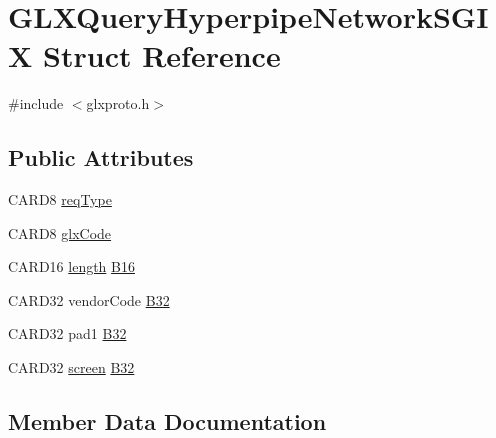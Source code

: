 \hypertarget{struct_g_l_x_query_hyperpipe_network_s_g_i_x}{}\section{G\+L\+X\+Query\+Hyperpipe\+Network\+S\+G\+IX Struct Reference}
\label{struct_g_l_x_query_hyperpipe_network_s_g_i_x}


{\ttfamily \#include $<$glxproto.\+h$>$}

\subsection*{Public Attributes}
\begin{DoxyCompactItemize}
\item 
C\+A\+R\+D8 \hyperlink{struct_g_l_x_query_hyperpipe_network_s_g_i_x_a19f7318eb42362aea35758a7ef076a65}{req\+Type}
\item 
C\+A\+R\+D8 \hyperlink{struct_g_l_x_query_hyperpipe_network_s_g_i_x_a4e79bfc34869610ed04694ca723fdf6e}{glx\+Code}
\item 
C\+A\+R\+D16 \hyperlink{glcorearb_8h_ab9c919755bde3b34349e23a32b4e0fa7}{length} \hyperlink{struct_g_l_x_query_hyperpipe_network_s_g_i_x_a7eaae9e86f0e5b48330c936e6e951ac2}{B16}
\item 
C\+A\+R\+D32 vendor\+Code \hyperlink{struct_g_l_x_query_hyperpipe_network_s_g_i_x_afac72e950f26a6c6340463502574396f}{B32}
\item 
C\+A\+R\+D32 pad1 \hyperlink{struct_g_l_x_query_hyperpipe_network_s_g_i_x_a282ea4c08dc7cfe69edec7dc02933666}{B32}
\item 
C\+A\+R\+D32 \hyperlink{cad_8h_ae04e09e4e3831bfc1632c509ae37dcec}{screen} \hyperlink{struct_g_l_x_query_hyperpipe_network_s_g_i_x_a71afe950eaab6e945b0e11646947e3b4}{B32}
\end{DoxyCompactItemize}


\subsection{Member Data Documentation}
\mbox{\label{struct_g_l_x_query_hyperpipe_network_s_g_i_x_a7eaae9e86f0e5b48330c936e6e951ac2}} 
